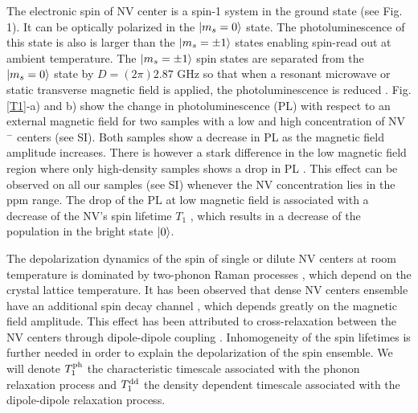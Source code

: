 \documentclass[preprintnumbers,amsmath,amssymb,superscriptaddress,twocolumn,showpacs]{revtex4-2}
\begin{document}
The electronic spin of NV center is a spin-1 system in the ground state (see Fig. 1). It can be optically polarized in the $\ket{m_s=0}$ state. The photoluminescence of this state is also is larger than the $\ket{m_s=\pm 1}$ states enabling spin-read out at ambient temperature. The $\ket{m_s=\pm 1}$ spin states are separated from the $\ket{m_s=0}$ state by  $D = (2\pi) 2.87$ GHz so that when a resonant microwave or static transverse magnetic field is applied, the photoluminescence is reduced \citep{epstein2005anisotropic,lai2009influence}. 
Fig.  \ref{T1}-a) and b) show the change in photoluminescence (PL) with respect to an external magnetic field for two samples with a low and high concentration of NV$^-$ centers (see SI). Both samples show a decrease in PL as the magnetic field amplitude increases.  There is however a stark difference in the low magnetic field region where only high-density samples shows a drop in PL \citep{jarmola_longitudinal_2015,  mrozek_longitudinal_2015}. This effect can be observed on all our samples (see SI) whenever the NV concentration lies in the ppm range. The drop of the PL at low magnetic field is associated with a decrease of the NV's spin lifetime $T_1$ \citep{jarmola_temperature-_2012}, which results in a decrease of the population in the bright state $\ket{0}$.

The depolarization dynamics of the spin of single or dilute NV centers at room temperature is dominated by two-phonon Raman processes \citep{redman1991spin,jarmola_temperature-_2012,norambuena2018spin}, which depend on the crystal lattice temperature. It has been observed that dense NV centers ensemble have an additional spin decay channel \citep{jarmola_temperature-_2012,jarmola_longitudinal_2015,mrozek_longitudinal_2015, choi2017depolarization, akhmedzhanov_microwave-free_2017, akhmedzhanov_magnetometry_2019, pellet2021magnetic, mrozek2021characterization}, which depends greatly on the magnetic field amplitude. This effect has been attributed to cross-relaxation between the NV centers through dipole-dipole coupling \citep{mrozek_longitudinal_2015, choi2017depolarization}.  Inhomogeneity of the spin lifetimes is further needed in order to explain the depolarization of the spin ensemble. We will denote $T_1^{\rm ph}$ the characteristic timescale associated with the phonon relaxation process and $T_1^{\rm dd}$ the density dependent timescale associated with the dipole-dipole relaxation process.
\end{document}
